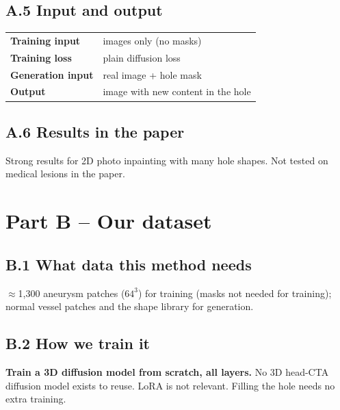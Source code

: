 \documentclass[11pt,a4paper,oneside]{report}
\begin{document}
\subsection*{A.5 Input and output}
\begin{center}
\small
\begin{tabularx}{\linewidth}{lX}
\toprule
\textbf{Training input} & images only (no masks) \\
\textbf{Training loss} & plain diffusion loss \\
\textbf{Generation input} & real image + hole mask \\
\textbf{Output} & image with new content in the hole \\
\bottomrule
\end{tabularx}
\end{center}

\subsection*{A.6 Results in the paper}
Strong results for 2D photo inpainting with many hole shapes. Not tested on medical lesions in the paper.

\section{Part B -- Our dataset}

\subsection*{B.1 What data this method needs}
$\approx$1{,}300 aneurysm patches ($64^3$) for training (masks not needed for training); normal vessel patches and the shape library for generation.

\subsection*{B.2 How we train it}
\textbf{Train a 3D diffusion model from scratch, all layers.} No 3D head-CTA diffusion model exists to reuse. LoRA is not relevant. Filling the hole needs no extra training.
\end{document}
